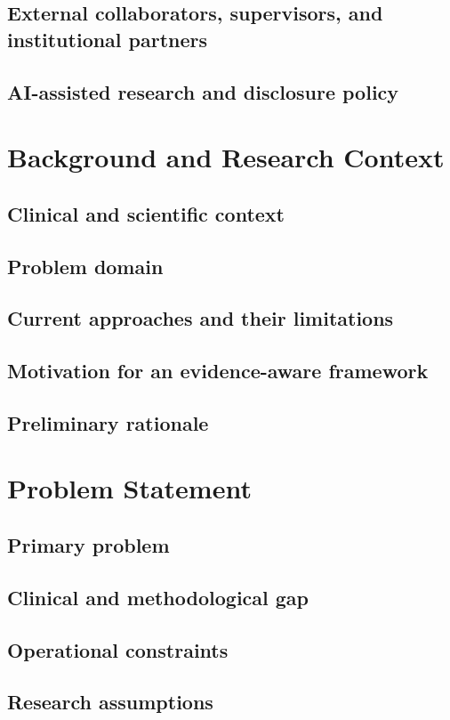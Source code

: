 \documentclass[11pt,journal,onecolumn,draftclsnofoot]{IEEEtran}
\begin{document}
\subsection{External collaborators, supervisors, and institutional partners}
\subsection{AI-assisted research and disclosure policy}

\section{Background and Research Context}
\subsection{Clinical and scientific context}
\subsection{Problem domain}
\subsection{Current approaches and their limitations}
\subsection{Motivation for an evidence-aware framework}
\subsection{Preliminary rationale}

\section{Problem Statement}
\subsection{Primary problem}
\subsection{Clinical and methodological gap}
\subsection{Operational constraints}
\subsection{Research assumptions}
\end{document}
